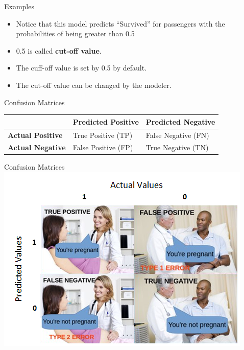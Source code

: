 \documentclass[
  ignorenonframetext,
]{beamer}
\providecommand{\tightlist}{%
  \setlength{\itemsep}{0pt}\setlength{\parskip}{0pt}}
\begin{document}
\begin{frame}{Examples}
\protect\hypertarget{examples-1}{}
\begin{itemize}
\tightlist
\item
  Notice that this model predicts ``Survived'' for passengers with the
  probabilities of being greater than 0.5
\item
  0.5 is called \textbf{cut-off value}.
\item
  The cuff-off value is set by 0.5 by default.
\item
  The cut-off value can be changed by the modeler.
\end{itemize}
\end{frame}

\begin{frame}{Confusion Matrices}
\protect\hypertarget{confusion-matrices}{}
\begin{longtable}[]{@{}lll@{}}
\toprule
& Predicted Positive & Predicted Negative \\
\midrule
\endhead
\textbf{Actual Positive} & True Positive (TP) & False Negative (FN) \\
\textbf{Actual Negative} & False Positive (FP) & True Negative (TN) \\
\bottomrule
\end{longtable}
\end{frame}

\begin{frame}{Confusion Matrices}
\protect\hypertarget{confusion-matrices-1}{}
\includegraphics{images/cm.png}
\end{frame}
\end{document}

